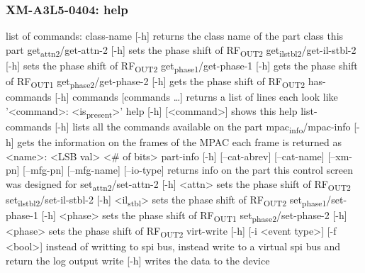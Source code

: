 \documentclass[11pt]{article}
\begin{document}
\subsubsection{XM-A3L5-0404: help}
\label{sec:org2e4f52f}
list of commands:
  class-name [-h]
    returns the class name of the part class this part
  get\textsubscript{attn}\textsubscript{2}/get-attn-2 [-h]
    sets the phase shift of RF\textsubscript{OUT2}
  get\textsubscript{il}\textsubscript{stbl}\textsubscript{2}/get-il-stbl-2 [-h]
    sets the phase shift of RF\textsubscript{OUT2}
  get\textsubscript{phase}\textsubscript{1}/get-phase-1 [-h]
    gets the phase shift of RF\textsubscript{OUT1}
  get\textsubscript{phase}\textsubscript{2}/get-phase-2 [-h]
    gets the phase shift of RF\textsubscript{OUT2}
  has-commands [-h] commands [commands \ldots{}]
    returns a list of lines each look like '<command>: <is\textsubscript{present}>'
  help [-h] [<command>]
    shows this help
  list-commands [-h]
    lists all the commands available on the part
  mpac\textsubscript{info}/mpac-info [-h]
    gets the information on the frames of the MPAC
    each frame is returned as <name>: <LSB val> <\# of bits>
  part-info  [-h] [--cat-abrev] [--cat-name] [--xm-pn] [--mfg-pn] [--mfg-name]
          [--io-type]
    returns info on the part this control screen was designed for
  set\textsubscript{attn}\textsubscript{2}/set-attn-2 [-h] <attn>
    sets the phase shift of RF\textsubscript{OUT2}
  set\textsubscript{il}\textsubscript{stbl}\textsubscript{2}/set-il-stbl-2 [-h] <il\textsubscript{stbl}>
    sets the phase shift of RF\textsubscript{OUT2}
  set\textsubscript{phase}\textsubscript{1}/set-phase-1 [-h] <phase>
    sets the phase shift of RF\textsubscript{OUT1}
  set\textsubscript{phase}\textsubscript{2}/set-phase-2 [-h] <phase>
    sets the phase shift of RF\textsubscript{OUT2}
  virt-write [-h] [-i <event type>] [-f <bool>]
    instead of writting to spi bus, instead write to a virtual spi bus
    and return the log output
  write [-h]
    writes the data to the device
\end{document}
